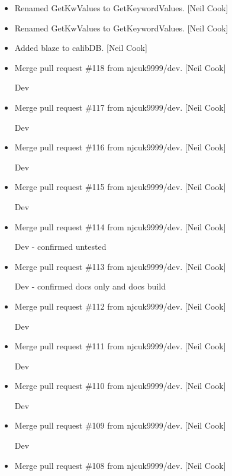\documentclass[a4paper,10pt,english]{report}
\begin{document}
\begin{itemize}
\item {} 
Renamed GetKwValues to GetKeywordValues. {[}Neil Cook{]}

\item {} 
Renamed GetKwValues to GetKeywordValues. {[}Neil Cook{]}

\item {} 
Added blaze to calibDB. {[}Neil Cook{]}

\item {} 
Merge pull request \#118 from njcuk9999/dev. {[}Neil Cook{]}

Dev

\item {} 
Merge pull request \#117 from njcuk9999/dev. {[}Neil Cook{]}

Dev

\item {} 
Merge pull request \#116 from njcuk9999/dev. {[}Neil Cook{]}

Dev

\item {} 
Merge pull request \#115 from njcuk9999/dev. {[}Neil Cook{]}

Dev

\item {} 
Merge pull request \#114 from njcuk9999/dev. {[}Neil Cook{]}

Dev - confirmed untested

\item {} 
Merge pull request \#113 from njcuk9999/dev. {[}Neil Cook{]}

Dev - confirmed docs only and docs build

\item {} 
Merge pull request \#112 from njcuk9999/dev. {[}Neil Cook{]}

Dev

\item {} 
Merge pull request \#111 from njcuk9999/dev. {[}Neil Cook{]}

Dev

\item {} 
Merge pull request \#110 from njcuk9999/dev. {[}Neil Cook{]}

Dev

\item {} 
Merge pull request \#109 from njcuk9999/dev. {[}Neil Cook{]}

Dev

\item {} 
Merge pull request \#108 from njcuk9999/dev. {[}Neil Cook{]}


\end{itemize}
\end{document}

